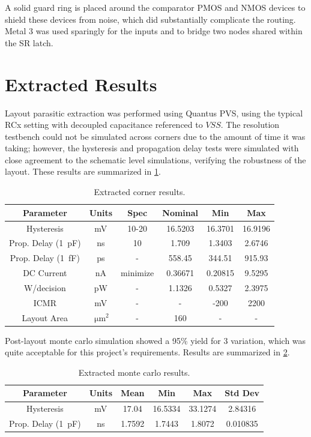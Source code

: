 \documentclass[11pt,letterpaper]{article}
\begin{document}
A solid guard ring is placed around the comparator PMOS and NMOS devices to shield these devices from noise, which did substantially complicate the routing. Metal 3 was used sparingly for the inputs and to bridge two nodes shared within the SR latch.

\section{Extracted Results}

Layout parasitic extraction was performed using Quantus PVS, using the typical RCx setting with decoupled capacitance referenced to \(VSS\). The resolution testbench could not be simulated across corners due to the amount of time it was taking; however, the hysteresis and propagation delay tests were simulated with close agreement to the schematic level simulations, verifying the robustness of the layout. These results are summarized in \cref{tab:ext_corners}.

\begin{table}[!t]
    \centering
    \begin{tabular}{c|c|c|c|c|c}
    \toprule
        Parameter & Units & Spec & Nominal & Min & Max \\
    \midrule
        Hysteresis & mV & 10-20 & 16.5203 & 16.3701 & 16.9196 \\
        Prop. Delay (\qty{1}{\pF}) & ns & 10 & 1.709 & 1.3403 & 2.6746 \\
        Prop. Delay (\qty{1}{\fF}) & ps & - & 558.45 & 344.51 & 915.93 \\
        DC Current & nA & minimize & 0.36671 & 0.20815 & 9.5295 \\
        W/decision & pW & - & 1.1326 & 0.5327 & 2.3975 \\
        ICMR & mV & - & - & -200 & 2200 \\
        Layout Area & \(\qty{}{\um^2}\) & - & 160 & - & - \\
    \bottomrule
        
    \end{tabular}
    \caption{Extracted corner results.}
    \label{tab:ext_corners}
\end{table}

Post-layout monte carlo simulation showed a 95\% yield for \qty{3}{\sig} variation, which was quite acceptable for this project's requirements. Results are summarized in \cref{tab:ext_mc}.

\begin{table}[!t]
    \centering
    \begin{tabular}{c|c|c|c|c|c}
    \toprule
        Parameter & Units & Mean & Min & Max & Std Dev \\
    \midrule
        Hysteresis & mV & 17.04 & 16.5334 & 33.1274 & 2.84316 \\
        Prop. Delay (\qty{1}{\pF}) & ns & 1.7592 & 1.7443 & 1.8072 & 0.010835 \\
    \bottomrule
        
    \end{tabular}
    \caption{Extracted monte carlo results.}
    \label{tab:ext_mc}
\end{table}
\end{document}
